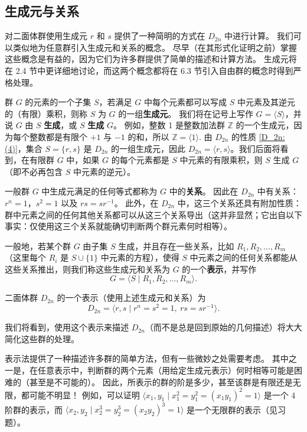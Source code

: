 \subsection*{生成元与关系}

对二面体群使用生成元 \( r \) 和 \( s \) 提供了一种简明的方式在 \( D_{2n} \) 中进行计算。
我们可以类似地为任意群引入生成元和关系的概念。
尽早（在其形式化证明之前）掌握这些概念是有益的，因为它们为许多群提供了简单的描述和计算方法。
生成元将在 2.4 节中更详细地讨论，而这两个概念都将在 6.3 节引入自由群的概念时得到严格处理。

群 \( G \) 的元素的一个子集 \( S \)，若满足 \( G \) 中每个元素都可以写成 \( S \) 中元素及其逆元的（有限）乘积，则称 \( S \) 为 \( G \) 的一组\textbf{生成元}。
我们将在记号上写作 \( G = \langle S \rangle \)，并说 \( G \) 由 \( S \) \textbf{生成}，或 \( S \) \textbf{生成} \( G \)。
例如，整数 1 是整数加法群 \( \mathbb{Z} \) 的一个生成元，因为每个整数都是有限个 \(+1\) 与 \(-1\) 的和，所以 \( \mathbb{Z} = \langle 1 \rangle \). 
由 \( D_{2n} \) 的性质 \ref{D_2n:(4)}，集合 \( S = \{r, s\} \) 是 \( D_{2n} \) 的一组生成元，因此 \( D_{2n} = \langle r, s \rangle \)。我们后面将看到，在有限群 \( G \) 中，如果 \( G \) 的每个元素都是 \( S \) 中元素的有限乘积，则 \( S \) 生成 \( G \)（即不必再包含 \( S \) 中元素的逆元）。

一般群 \( G \) 中生成元满足的任何等式都称为 \( G \) 中的\textbf{关系}。
因此在 \( D_{2n} \) 中有关系：\( r^n = 1 \)，\( s^2 = 1 \) 以及 \( rs = sr^{-1} \)。
此外，在 \( D_{2n} \) 中，这三个关系还具有附加性质：群中元素之间的任何其他关系都可以从这三个关系导出（这并非显然；它出自以下事实：仅使用这三个关系就能确切判断两个群元素何时相等）。

一般地，若某个群 \( G \) 由子集 \( S \) 生成，并且存在一些关系，比如 \( R_1, R_2, \ldots, R_m \)（这里每个 \( R_i \) 是 \( S \cup \{1\} \) 中元素的方程），使得 \( S \) 中元素之间的任何关系都能从这些关系推出，则我们称这些生成元和关系为 \( G \) 的一个\textbf{表示}，并写作
\[
G = \langle S \mid R_1, R_2, \ldots, R_m \rangle.
\]

二面体群 \( D_{2n} \) 的一个表示（使用上述生成元和关系）为
\[
D_{2n} = \langle r, s \mid r^n = s^2 = 1,\ rs = sr^{-1} \rangle. \tag{1.1}
\]

我们将看到，使用这个表示来描述 \( D_{2n} \)（而不是总是回到原始的几何描述）将大大简化这些群的处理。

表示法提供了一种描述许多群的简单方法，但有一些微妙之处需要考虑。
其中之一是，在任意表示中，判断群的两个元素（用给定生成元表示）何时相等可能是困难的（甚至是不可能的）。
因此，所表示的群的阶是多少，甚至该群是有限还是无限，都可能不明显！
例如，可以证明 \( \langle x_1, y_1 \mid x_1^2 = y_1^2 = (x_1y_1)^2 = 1 \rangle \) 是一个 4 阶群的表示，而 \( \langle x_2, y_2 \mid x_2^3 = y_2^3 = (x_2y_2)^3 = 1 \rangle \) 是一个无限群的表示（见习题）。

